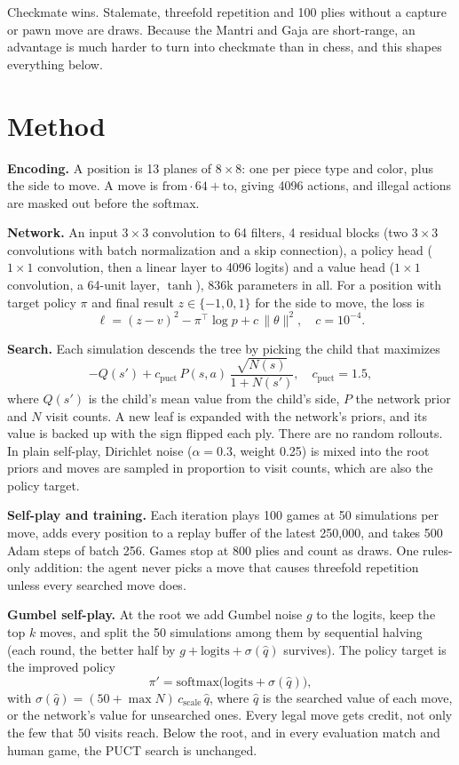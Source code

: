 \documentclass[11pt,a4paper,twocolumn]{article}
\begin{document}
\noindent Checkmate wins. Stalemate, threefold repetition and 100 plies without a capture
or pawn move are draws. Because the Mantri and Gaja are short-range, an advantage is much
harder to turn into checkmate than in chess, and this shapes everything below.

\section{Method}
\textbf{Encoding.} A position is 13 planes of $8\times8$: one per piece type and color, plus
the side to move. A move is $\text{from}\cdot64+\text{to}$, giving 4096 actions, and
illegal actions are masked out before the softmax.

\textbf{Network.} An input $3\times3$ convolution to 64 filters, 4 residual blocks (two
$3\times3$ convolutions with batch normalization and a skip connection), a policy head
($1\times1$ convolution, then a linear layer to 4096 logits) and a value head ($1\times1$
convolution, a 64-unit layer, $\tanh$), 836k parameters in all. For a position with target
policy $\pi$ and final result $z\in\{-1,0,1\}$ for the side to move, the loss is
\begin{equation}
\ell = (z - v)^2 - \pi^\top \log p + c\,\lVert\theta\rVert^2,\quad c=10^{-4}.
\end{equation}

\textbf{Search.} Each simulation descends the tree by picking the child that maximizes
\begin{equation}
-Q(s') + c_{\text{puct}}\, P(s,a)\,\frac{\sqrt{N(s)}}{1+N(s')},\quad c_{\text{puct}}=1.5,
\end{equation}
where $Q(s')$ is the child's mean value from the child's side, $P$ the network prior and $N$
visit counts. A new leaf is expanded with the network's priors, and its value is backed up
with the sign flipped each ply. There are no random rollouts. In plain self-play, Dirichlet
noise ($\alpha=0.3$, weight 0.25) is mixed into the root priors and moves are sampled in
proportion to visit counts, which are also the policy target.

\textbf{Self-play and training.} Each iteration plays 100 games at 50 simulations per move,
adds every position to a replay buffer of the latest 250,000, and takes 500 Adam steps of
batch 256. Games stop at 800 plies and count as draws. One rules-only addition: the agent
never picks a move that causes threefold repetition unless every searched move does.

\textbf{Gumbel self-play.} At the root we add Gumbel noise $g$ to the logits, keep the top
$k$ moves, and split the 50 simulations among them by sequential halving (each round, the
better half by $g + \text{logits} + \sigma(\hat q)$ survives). The policy target is the
improved policy
\begin{equation}
\pi' = \text{softmax}\big(\text{logits} + \sigma(\hat q)\big),
\end{equation}
with $\sigma(\hat q) = (50 + \max N)\, c_{\text{scale}}\, \hat q$, where $\hat q$ is the searched value of each move, or the network's value for unsearched
ones. Every legal move gets credit, not only the few that 50 visits reach. Below the root,
and in every evaluation match and human game, the PUCT search is unchanged.
\end{document}
